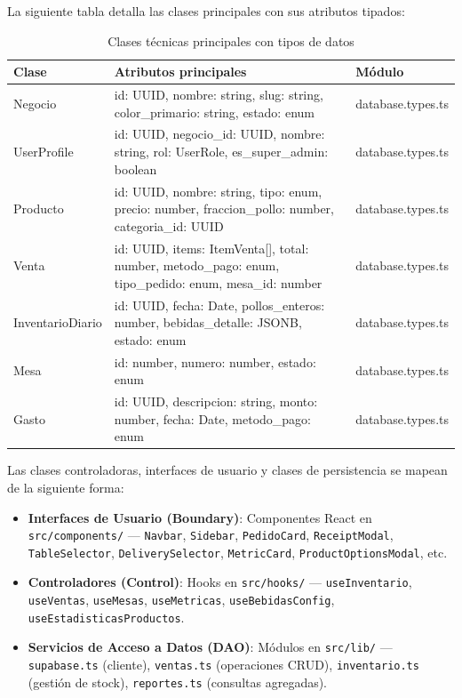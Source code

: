 \documentclass[12pt, a4paper]{article}
\begin{document}
La siguiente tabla detalla las clases principales con sus atributos tipados:

\begin{table}[H]
\centering
\caption{Clases técnicas principales con tipos de datos}
\footnotesize
\begin{tabularx}{\textwidth}{|l|X|l|}
    \hline
    \textbf{Clase} & \textbf{Atributos principales} & \textbf{Módulo} \\ \hline
    Negocio & id: UUID, nombre: string, slug: string, color\_primario: string, estado: enum & database.types.ts \\ \hline
    UserProfile & id: UUID, negocio\_id: UUID, nombre: string, rol: UserRole, es\_super\_admin: boolean & database.types.ts \\ \hline
    Producto & id: UUID, nombre: string, tipo: enum, precio: number, fraccion\_pollo: number, categoria\_id: UUID & database.types.ts \\ \hline
    Venta & id: UUID, items: ItemVenta[], total: number, metodo\_pago: enum, tipo\_pedido: enum, mesa\_id: number & database.types.ts \\ \hline
    InventarioDiario & id: UUID, fecha: Date, pollos\_enteros: number, bebidas\_detalle: JSONB, estado: enum & database.types.ts \\ \hline
    Mesa & id: number, numero: number, estado: enum & database.types.ts \\ \hline
    Gasto & id: UUID, descripcion: string, monto: number, fecha: Date, metodo\_pago: enum & database.types.ts \\ \hline
\end{tabularx}
\end{table}

Las clases controladoras, interfaces de usuario y clases de persistencia se mapean de la siguiente forma:

\begin{itemize}[leftmargin=2cm]
    \item \textbf{Interfaces de Usuario (Boundary)}: Componentes React en \texttt{src/components/} --- \texttt{Navbar}, \texttt{Sidebar}, \texttt{PedidoCard}, \texttt{ReceiptModal}, \texttt{TableSelector}, \texttt{DeliverySelector}, \texttt{MetricCard}, \texttt{ProductOptionsModal}, etc.
    \item \textbf{Controladores (Control)}: Hooks en \texttt{src/hooks/} --- \texttt{useInventario}, \texttt{useVentas}, \texttt{useMesas}, \texttt{useMetricas}, \texttt{useBebidasConfig}, \texttt{useEstadisticasProductos}.
    \item \textbf{Servicios de Acceso a Datos (DAO)}: Módulos en \texttt{src/lib/} --- \texttt{supabase.ts} (cliente), \texttt{ventas.ts} (operaciones CRUD), \texttt{inventario.ts} (gestión de stock), \texttt{reportes.ts} (consultas agregadas).
\end{itemize}
\end{document}

